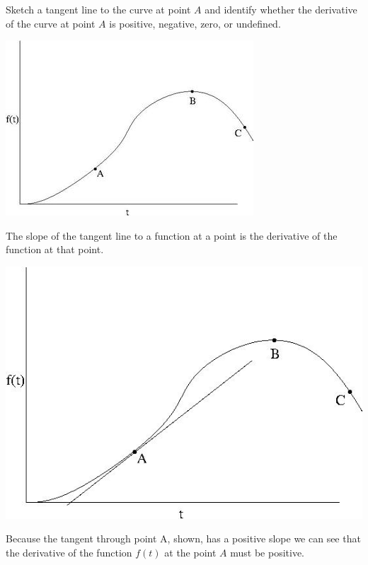 \documentclass{ximera}
\author{Emma Smith Zbarsky}
\begin{document}
\begin{exercise}

Sketch a tangent line to the curve at point $A$ and identify whether the
derivative of the curve at point $A$ is positive, negative, zero, or
undefined. 

\begin{image}\includegraphics[width=.5\textwidth]{slopedgraph.jpg}\end{image}


\begin{hint}
The slope of the tangent line to a function at a point is the derivative
of the function at that point.
\end{hint}


\begin{hint}
\begin{image}\includegraphics[width=.5\textwidth]{slopedgraphtangentA.jpg}\end{image}

 Because the tangent through point A,
shown, has a positive slope we can see that the derivative of the
function $f(t)$ at the point $A$ must be positive.
\end{hint}


\begin{multipleChoice}
\end{multipleChoice}

\end{exercise}
\end{document}

